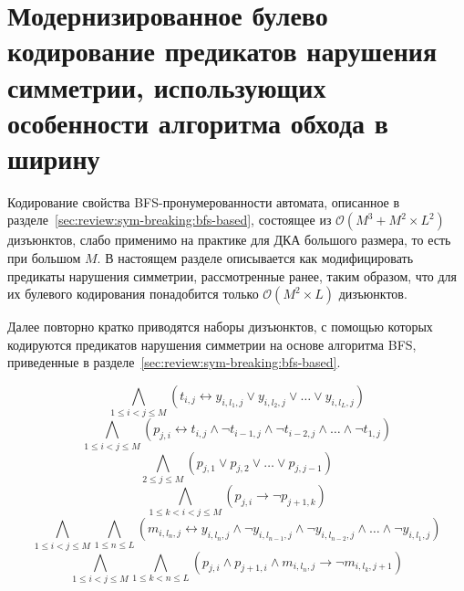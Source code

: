 
\section{Модернизированное булево кодирование предикатов нарушения симметрии, использующих особенности алгоритма обхода в ширину} 
\label{sec:space:tight}

Кодирование свойства BFS-пронумерованности автомата, описанное в разделе~\ref{sec:review:sym-breaking:bfs-based}, состоящее из $\mathcal{O}\left(M^{3} + M^{2} \times L^{2}\right)$ дизъюнктов, слабо применимо на практике для ДКА большого размера, то есть при большом $M$. 
В настоящем разделе описывается как модифицировать предикаты нарушения симметрии, рассмотренные ранее, таким образом, что для их булевого кодирования понадобится только $\mathcal{O}\left(M^{2} \times L\right)$ дизъюнктов.

Далее повторно кратко приводятся наборы дизъюнктов, с помощью которых кодируются предикатов нарушения симметрии на основе алгоритма BFS, приведенные в разделе~\ref{sec:review:sym-breaking:bfs-based}.

\begin{equation}
\label{eq:t-def}
  \bigwedge_{1 \leq i < j \leq M} \left(t_{i,j} \leftrightarrow y_{i,l_{1},j} \vee y_{i,l_{2},j} \vee \ldots \vee y_{i,l_{L},j} \right)
\end{equation}
%
\begin{equation}
\label{eq:p-def}
  \bigwedge_{1 \leq i < j \leq M} \left(p_{j,i} \leftrightarrow t_{i,j} \wedge \neg t_{i - 1,j} \wedge \neg t_{i - 2, j} \wedge \ldots \wedge \neg t_{1,j}\right)
\end{equation}
%
\begin{equation}
\label{eq:p-alo}
  \bigwedge_{2 \leq j \leq M} \left(p_{j,1} \vee p_{j,2} \vee \ldots \vee p_{j,j - 1}\right)
\end{equation}
%
\begin{equation}
\label{eq:p-order}
  \bigwedge_{1 \leq k < i < j \leq M} \left(p_{j,i} \rightarrow \neg p_{j + 1, k}\right)
\end{equation}
%
\begin{equation}
\label{eq:m-def}
  \bigwedge_{1 \leq i < j \leq M} \bigwedge_{1 \leq n \leq L} \left(m_{i,l_{n},j} \leftrightarrow y_{i,l_{n},j} \wedge \neg y_{i,l_{n - 1}, j} \wedge \neg y_{i,l_{n - 2}, j} \wedge \ldots \wedge \neg y_{i,l_{1},j} \right)
\end{equation}
%
\begin{equation}
\label{eq:m-order}
  \bigwedge_{1 \leq i < j \leq M} \bigwedge_{1 \leq k < n \leq L} \left(p_{j,i} \wedge p_{j + 1, i} \wedge m_{i,l_{n}, j} \rightarrow \neg m_{i, l_{k}, j + 1}\right)
\end{equation}

